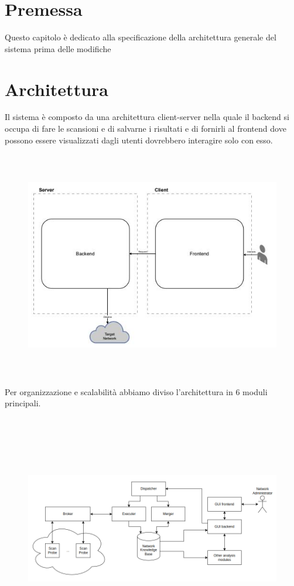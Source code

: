 \documentclass[target=bach,aauheader=,style=]{thud}
\begin{document}
\section{Premessa}
Questo capitolo è dedicato alla specificazione della architettura generale del sistema prima delle modifiche 

\section{Architettura}
Il sistema è composto da una architettura client-server nella quale il backend si occupa di fare le scansioni e di salvarne i risultati e di fornirli al frontend dove possono essere visualizzati dagli utenti dovrebbero interagire solo con esso. 


\begin{figure}[h]
  \includegraphics[width=15cm, height=10cm]{client_server}
  \centering
\end{figure}

\FloatBarrier

Per organizzazione e scalabilità abbiamo diviso l'architettura in 6 moduli principali.


\begin{figure}[h]
  \includegraphics[width=15cm, height=10cm]{moduli_new}
  \centering
\end{figure}
\end{document}

